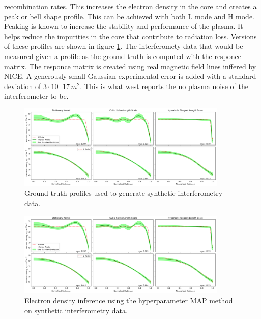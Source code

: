 recombination rates. This increases the electron density in the core and creates a peak or bell shape profile. This can be achieved with both L mode and H mode. Peaking is known to increase the stability and performance of the plasma. It helps reduce the impurities in the core that contribute to radiation loss. Versions of these profiles are shown in figure \ref{fig:groundtruth}. The interferomety data that would be measured given a profile as the ground truth is computed with the responce matrix. The responce matrix is created using real magnetic field lines inffered by NICE. A generously small Gaussian experimental error is added with a standard deviation of $3\cdot10^-17 \, m^2$. This is what \gls{west} reports the no plasma noise of the interferometer to be.  

\begin{figure}[ht]
    \centering
    \includegraphics[width=10cm, angle=90]{images/Final/MAPsynthetic_final_hl.png}
    \caption{Ground truth profiles used to generate synthetic interferometry data.}
    \label{fig:groundtruth}
\end{figure}

\begin{figure}[ht]
    \centering
    \includegraphics[width=10cm, angle=90]{images/Final/MAPsynthetic_final_hl.png}
    \caption{Electron density inference using the hyperparameter MAP method on synthetic interferometry data.}
    \label{fig:mapsynthetic}
\end{figure}

